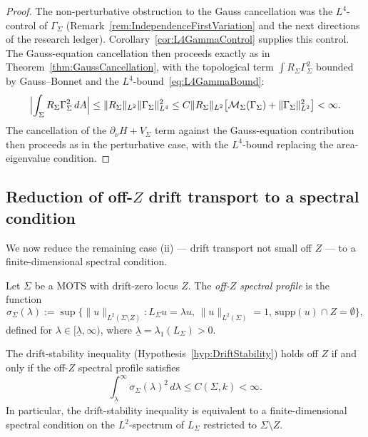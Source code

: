 \begin{proof}
The non-perturbative obstruction to the Gauss cancellation was the $L^4$-control of $\Gamma_\Sigma$ (Remark~\ref{rem:IndependenceFirstVariation} and the next directions of the research ledger). Corollary~\ref{cor:L4GammaControl} supplies this control. The Gauss-equation cancellation then proceeds exactly as in Theorem~\ref{thm:GaussCancellation}, with the topological term $\int R_\Sigma\Gamma_\Sigma^2$ bounded by Gauss--Bonnet and the $L^4$-bound~\eqref{eq:L4GammaBound}:
\[
    \Bigl|\int_\Sigma R_\Sigma\Gamma_\Sigma^2\,dA\Bigr|
    \le
    \|R_\Sigma\|_{L^2}\|\Gamma_\Sigma\|_{L^4}^2
    \le
    C\|R_\Sigma\|_{L^2}\bigl[\mathcal M_\Sigma(\Gamma_\Sigma)+\|\Gamma_\Sigma\|_{L^2}^2\bigr]
    <\infty.
\]
The cancellation of the $\partial_\nu H+V_\Sigma$ term against the Gauss-equation contribution then proceeds as in the perturbative case, with the $L^4$-bound replacing the area-eigenvalue condition.
\end{proof}

\subsection{Reduction of off-$Z$ drift transport to a spectral condition}

We now reduce the remaining case (ii) — drift transport not small off $Z$ — to a finite-dimensional spectral condition.

\begin{definition}\label{def:OffZSpectralProfile}
Let $\Sigma$ be a MOTS with drift-zero locus $Z$. The \emph{off-$Z$ spectral profile} is the function
\begin{equation}\label{eq:OffZSpectralProfile}
    \sigma_\Sigma(\lambda):=\sup\bigl\{\|u\|_{L^2(\Sigma\setminus Z)}:L_\Sigma u=\lambda u,\,\|u\|_{L^2(\Sigma)}=1,\,\mathrm{supp}(u)\cap Z=\emptyset\bigr\},
\end{equation}
defined for $\lambda\in[\underline\lambda,\infty)$, where $\underline\lambda=\lambda_1(L_\Sigma)>0$.
\end{definition}

\begin{theorem}\label{thm:SpectralReductionOffZ}
The drift-stability inequality (Hypothesis~\ref{hyp:DriftStability}) holds off $Z$ if and only if the off-$Z$ spectral profile satisfies
\begin{equation}\label{eq:OffZSpectralBound}
    \int_{\underline\lambda}^{\infty}\sigma_\Sigma(\lambda)^2\,d\lambda
    \le
    C(\Sigma,k)<\infty.
\end{equation}
In particular, the drift-stability inequality is equivalent to a finite-dimensional spectral condition on the $L^2$-spectrum of $L_\Sigma$ restricted to $\Sigma\setminus Z$.
\end{theorem}

